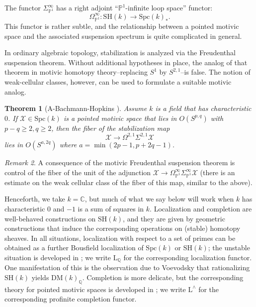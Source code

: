 \documentclass[11pt,leqno]{article}
\newcommand{\cplx}{{\mathbb C}}
\newcommand{\Q}{{\mathbb Q}}
\newcommand{\pone}{{\mathbb P}^1}
\renewcommand{\1}{{\rm 1\hspace*{-0.4ex}%
\rule{0.1ex}{1.52ex}\hspace*{0.2ex}}}
\renewcommand{\L}{{\mathrm L}}
\newcommand{\SH}{{\mathrm{SH}}}
\newcommand{\Spc}{\mathrm{Spc}}
\newcommand{\<}[1]{{\langle}#1 {\rangle}}
\theoremstyle{plain}
\newtheorem{theorem}{Theorem}[subsection]
\theoremstyle{definition}
\theoremstyle{remark}
\newtheorem{rem}[theorem]{Remark}
\numberwithin{equation}{subsection}
\begin{document}
The functor $\Sigma^{\infty}_{\pone}$ has a right adjoint ``$\pone$-infinite loop space'' functor: 
\[
\Omega^{\infty}_{\pone}: \SH(k) \longrightarrow \Spc(k)_*.
\]  
This functor is rather subtle, and the relationship between a pointed motivic space and the associated suspension spectrum is quite complicated in general.  

In ordinary algebraic topology, stabilization is analyzed via the Freudenthal suspension theorem.  Without additional hypotheses in place, the analog of that theorem in motivic homotopy theory--replacing $S^{1}$ by $S^{2,1}$--is false.  The notion of weak-cellular classes, however, can be used to formulate a suitable motivic analog.  

\begin{theorem}[A-Bachmann-Hopkins {\cite[Theorem 1]{ABHFreudenthal}}]
	\label{thm:freudenthal}
	Assume $k$ is a field that has characteristic $0$.  If $\mathscr{X} \in \Spc(k)$ is a pointed motivic space that lies in $O(S^{p,q})$ with $p -q \ge 2, q \geq 2$, then the fiber of the stabilization map
	\[
	\mathscr{X} \longrightarrow \Omega^{2,1}\Sigma^{2,1} \mathscr{X}
	\]
	lies in $O(S^{a,2q})$ where $a = \min(2p-1,p+2q-1)$.
\end{theorem}

\begin{rem}
	A consequence of the motivic Freudenthal suspension theorem is control of the fiber of the unit of the adjunction $\mathscr{X} \to \Omega^{\infty}_{\pone}\Sigma^{\infty}_{\pone} \mathscr{X}$ (there is an estimate on the weak cellular class of the fiber of this map, similar to the above).
\end{rem} 

Henceforth, we take $k = \cplx$, but much of what we say below will work when $k$ has characteristic $0$ and $-1$ is a sum of squares in $k$.  Localization and completion are well-behaved constructions on $\SH(k)$, and they are given by geometric constructions that induce the corresponding operations on (stable) homotopy sheaves.  In all situations, localization with respect to a set of primes can be obtained as a further Bousfield localization of $\Spc(k)$ or $\SH(k)$; the unstable situation is developed in \cite{AFHLocalization}; we write $\L_{\Q}$ for the corresponding localization functor.  One manifestation of this is the observation due to Voevodsky that rationalizing $\SH(k)$ yields $\mathrm{DM}(k)_{\Q}$.  Completion is more delicate, but the corresponding theory for pointed motivic spaces is developed in \cite{Mattis2024UnstablePCompletion}; we write $\L^{\wedge}$ for the corresponding profinite completion functor.  
\end{document}
